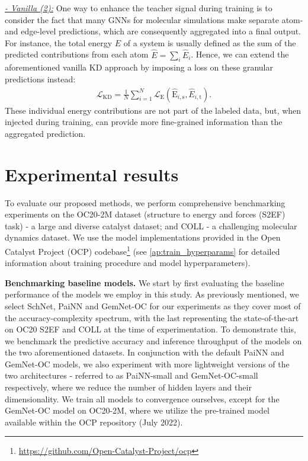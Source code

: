 \documentclass{article}
\newcommand{\loss}{\mathcal{L}}
\begin{document}
\underline{\emph{- Vanilla (2):}}
One way to enhance the teacher signal during training is to consider the fact that many GNNs for molecular simulations make separate atom- and edge-level predictions, which are consequently aggregated into a final output. For instance, the total energy $E$ of a system is usually defined as the sum of the predicted contributions from each atom $\hat{E} = \sum_i \hat{E}_i$. Hence, we can extend the aforementioned vanilla KD approach by imposing a loss on these granular predictions instead:
\begin{align}
    \loss_{\text{KD}} = \frac{1}{N} \sum_{i=1}^N \loss_\text{E}(\hat{\text{E}}_{i,\text{s}}, \hat{E}_{i,\text{t}}).
\end{align}
These individual energy contributions are not part of the labeled data, but, when injected during training, can provide more fine-grained information than the aggregated prediction.

\section{Experimental results}
To evaluate our proposed methods, we perform comprehensive benchmarking experiments on the OC20-2M \cite{chanussot_open_2021} dataset (structure to energy and forces (S2EF) task) - a large and diverse catalyst dataset; and COLL \cite{gasteiger_dimenetpp_2020} - a challenging molecular dynamics dataset. 
We use the model implementations provided in the Open Catalyst Project (OCP) codebase\footnote{\url{https://github.com/Open-Catalyst-Project/ocp}} (see \cref{ap:train_hyperparams} for detailed information about training procedure and model hyperparameters).

\textbf{Benchmarking baseline models.} 
We start by first evaluating the baseline performance of the models we employ in this study. As previously mentioned, we select SchNet, PaiNN and GemNet-OC for our experiments as they cover most of the accuracy-complexity spectrum, with the last representing the state-of-the-art on OC20 S2EF and COLL at the time of experimentation. To demonstrate this, we benchmark the predictive accuracy and inference throughput of the models on the two aforementioned datasets. In conjunction with the default PaiNN and GemNet-OC models, we also experiment with more lightweight versions of the two architectures - referred to as PaiNN-small and GemNet-OC-small respectively, where we reduce the number of hidden layers and their dimensionality. We train all models to convergence ourselves, except for the GemNet-OC model on OC20-2M, where we utilize the pre-trained model available within the OCP repository (July 2022).
\end{document}

